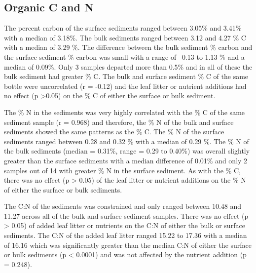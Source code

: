 \subsection{Organic C and N}

The percent carbon of the surface sediments ranged between 3.05\% and 3.41\% with a median of 3.18\%.  The bulk sediments ranged between 3.12 and 4.27 \% C with a median of 3.29 \%.  The difference between the bulk sediment \% carbon and the surface sediment \% carbon was small with a range of --0.13 to 1.13 \% and a median of 0.09\%. Only 3 samples departed more than 0.5\% and in all of these the bulk sediment had greater \% C. The bulk and surface sediment \% C of the same bottle were uncorrelated (r = -0.12) and the leaf litter or nutrient additions had no effect (p >0.05) on the \% C of either the surface or bulk sediment.

The \% N in the sediments was very highly correlated with the \% C of the same sediment sample (r = 0.968) and therefore, the \% N of the bulk and surface sediments showed the same patterns as the \% C.  The \% N of the surface sediments ranged between 0.28 and 0.32 \% with a median of 0.29 \%. The \% N of the bulk sediments  (median = 0.31\%, range = 0.29 to 0.40\%) was overall slightly greater than the surface sediments with a median difference of 0.01\% and only 2 samples out of 14 with greater \% N in the surface sediment.  As with the \% C, there was no effect (p > 0.05) of the leaf litter or nutrient additions on the \% N of either the surface or bulk sediments. 

The C:N of the sediments was constrained and only ranged between 10.48 and 11.27 across all of the bulk and surface sediment samples. There was no effect (p > 0.05) of added leaf litter or nutrients on the C:N of either the bulk or surface sediments. The C:N of the added leaf litter ranged 15.22 to 17.36 with a median of 16.16 which was significantly greater than the median C:N of either the surface or bulk sediments (p < 0.0001) and was not affected by the nutrient addition (p = 0.248). 

    